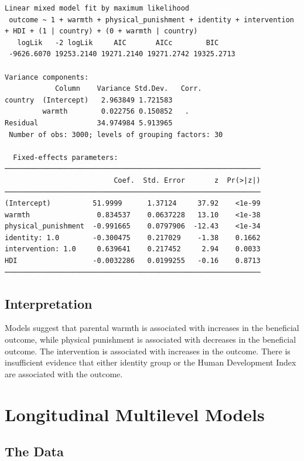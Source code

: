 \documentclass[
  letterpaper,
  DIV=11,
  numbers=noendperiod]{scrreprt}
\begin{document}
\begin{verbatim}
Linear mixed model fit by maximum likelihood
 outcome ~ 1 + warmth + physical_punishment + identity + intervention + HDI + (1 | country) + (0 + warmth | country)
   logLik   -2 logLik     AIC       AICc        BIC    
 -9626.6070 19253.2140 19271.2140 19271.2742 19325.2713

Variance components:
            Column    Variance Std.Dev.   Corr.
country  (Intercept)   2.963849 1.721583
         warmth        0.022756 0.150852   .  
Residual              34.974984 5.913965
 Number of obs: 3000; levels of grouping factors: 30

  Fixed-effects parameters:
─────────────────────────────────────────────────────────────
                          Coef.  Std. Error       z  Pr(>|z|)
─────────────────────────────────────────────────────────────
(Intercept)          51.9999      1.37124     37.92    <1e-99
warmth                0.834537    0.0637228   13.10    <1e-38
physical_punishment  -0.991665    0.0797906  -12.43    <1e-34
identity: 1.0        -0.300475    0.217029    -1.38    0.1662
intervention: 1.0     0.639641    0.217452     2.94    0.0033
HDI                  -0.0032286   0.0199255   -0.16    0.8713
─────────────────────────────────────────────────────────────
\end{verbatim}

\section{Interpretation}\label{interpretation-3}

Models suggest that parental warmth is associated with increases in the
beneficial outcome, while physical punishment is associated with
decreases in the beneficial outcome. The intervention is associated with
increases in the outcome. There is insufficient evidence that either
identity group or the Human Development Index are associated with the
outcome.


\chapter{Longitudinal Multilevel Models}\label{sec-longitudinal}

\section{The Data}\label{the-data}
\end{document}
